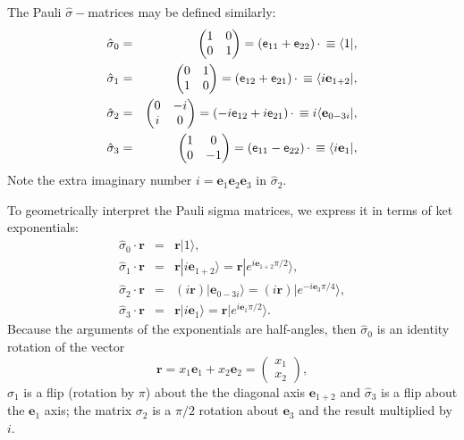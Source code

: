 \documentclass[11pt,twocolumn]{article}
\begin{document}
The Pauli $\hat\sigma-$matrices may be defined similarly:
\begin{eqnarray}
\label{eq:sigma_0 is 1 matrix}
\hat\sigma_0&=&
\begin{pmatrix}
1&0\\
0&1
\end{pmatrix}
=(\textsf e_{11}+\textsf e_{22})\,\cdot\,
\equiv\langle 1|,\\
\label{eq:sigma_1 is ie_1+2 matrix}
\hat\sigma_1&=&
\begin{pmatrix}
0&1\\
1&0
\end{pmatrix}
=(\textsf e_{12}+\textsf e_{21})\,\cdot\,\equiv\langle i\mathbf e_{1+2}|,\\
\label{eq:sigma_2 is ie_0-3i matrix}
\hat\sigma_2&=&
\begin{pmatrix}
0&-i\\
i&0
\end{pmatrix}
=(-i\textsf e_{12}+i\textsf e_{21})\,\cdot\,
\equiv i\langle \mathbf e_{0-3i}|,\\
\label{eq:sigma_3 is ie_1 matrix}
\hat\sigma_3&=&
\begin{pmatrix}
1&0\\
0&-1
\end{pmatrix}
=(\textsf e_{11}-\textsf e_{22})\,\cdot\,
\equiv \langle i\mathbf e_1|,
\end{eqnarray}
Note the extra imaginary number $i=\mathbf e_1\mathbf e_2\mathbf e_3$ in $\hat\sigma_2$.

To geometrically interpret the Pauli sigma matrices, we express it in terms of ket exponentials:
\begin{eqnarray}
\label{eq:sigma_0 r is r 1}
\hat\sigma_0\cdot\mathbf r&=&\mathbf r|1\rangle,\\
\label{eq:sigma_1 r is r ie_1+2}
\hat\sigma_1\cdot\mathbf r&=&\mathbf r|i\mathbf e_{1+2}\rangle=\mathbf r|e^{i\mathbf e_{1+2}\pi/2}\rangle,\\
\label{eq:sigma_2 r is r ie_0-3i}
\hat\sigma_2\cdot\mathbf r&=&(i\mathbf r)|\mathbf e_{0-3i}\rangle=(i\mathbf r)|e^{-i\mathbf e_3\pi/4}\rangle,\\
\label{eq:sigma_3 r is r ie_1}
\hat\sigma_3\cdot\mathbf r&=&\mathbf r|i\mathbf e_1\rangle=\mathbf r|e^{i\mathbf e_1\pi/2}\rangle.
\end{eqnarray}
Because the arguments of the exponentials are half-angles, then $\hat\sigma_0$ is an identity rotation of the vector 
\begin{equation}
\label{eq:r is x_1e_1 + x_2e_2 is column}
\mathbf r=x_1\mathbf e_1+x_2\mathbf e_2=
\begin{pmatrix}
x_1\\
x_2
\end{pmatrix}
,
\end{equation}
$\hat\sigma_1$ is a flip (rotation by $\pi$) about the the diagonal axis $\mathbf e_{1+2}$ and $\hat\sigma_3$ is a flip about the $\mathbf e_1$ axis; the matrix $\sigma_2$ is a $\pi/2$ rotation about $\mathbf e_3$ and the result multiplied by $i$. 
\end{document}

